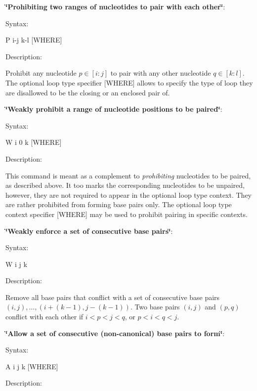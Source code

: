 \begin{DoxyEnumerate}
\item {\bfseries \char`\"{}\-Prohibiting two ranges of nucleotides to pair with each other\char`\"{}}\-:\par
 Syntax\-:\begin{DoxyVerb}P i-j k-l [WHERE] \end{DoxyVerb}
 Description\-:\par
 Prohibit any nucleotide $ p \in [i:j] $ to pair with any other nucleotide $ q \in [k:l] $. The optional loop type specifier {\ttfamily }\mbox{[}W\-H\-E\-R\-E\mbox{]} allows to specify the type of loop they are disallowed to be the closing or an enclosed pair of.
\item {\bfseries \char`\"{}\-Weakly prohibit a range of nucleotide positions to be paired\char`\"{}}\-:\par
 Syntax\-:\begin{DoxyVerb}W i 0 k [WHERE] \end{DoxyVerb}
 Description\-:\par
 This command is meant as a complement to {\itshape prohibiting} nucleotides to be paired, as described above. It too marks the corresponding nucleotides to be unpaired, however, they are not required to appear in the optional loop type context. They are rather prohibited from forming base pairs only. The optional loop type context specifier {\ttfamily }\mbox{[}W\-H\-E\-R\-E\mbox{]} may be used to prohibit pairing in specific contexts.
\item {\bfseries \char`\"{}\-Weakly enforce a set of consecutive base pairs\char`\"{}}\-:\par
 Syntax\-:\begin{DoxyVerb}W i j k \end{DoxyVerb}
\par
 Description\-:\par
 Remove all base pairs that conflict with a set of consecutive base pairs $ (i,j), \ldots, (i+(k-1), j-(k-1)) $. Two base pairs $ (i,j) $ and $ (p,q) $ conflict with each other if $ i < p < j < q $, or $ p < i < q < j $.
\item {\bfseries \char`\"{}\-Allow a set of consecutive (non-\/canonical) base pairs to form\char`\"{}}\-:\par
 Syntax\-:
\begin{DoxyCode}
A i j k [WHERE] 
\end{DoxyCode}
\par
 Description\-:\par

\end{DoxyEnumerate}
